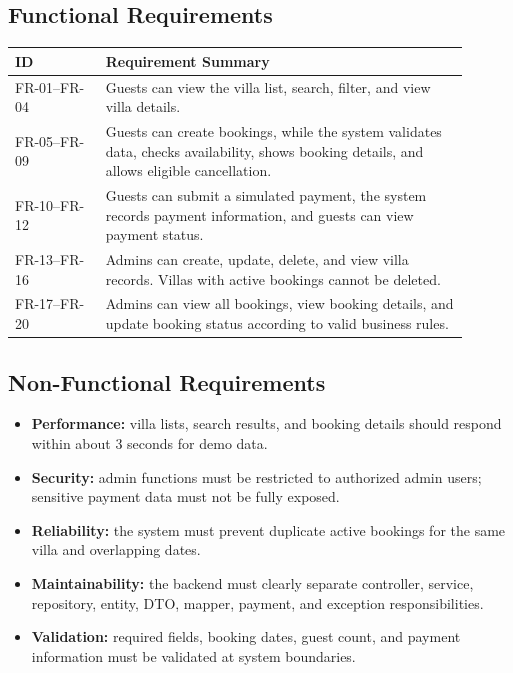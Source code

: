 \documentclass[12pt,a4paper]{article}
\begin{document}
\subsection{Functional Requirements}

\begin{longtable}{|L{0.18\linewidth}|L{0.72\linewidth}|}
\hline
\textbf{ID} & \textbf{Requirement Summary} \\
\hline
FR-01--FR-04 & Guests can view the villa list, search, filter, and view villa details. \\
\hline
FR-05--FR-09 & Guests can create bookings, while the system validates data, checks availability, shows booking details, and allows eligible cancellation. \\
\hline
FR-10--FR-12 & Guests can submit a simulated payment, the system records payment information, and guests can view payment status. \\
\hline
FR-13--FR-16 & Admins can create, update, delete, and view villa records. Villas with active bookings cannot be deleted. \\
\hline
FR-17--FR-20 & Admins can view all bookings, view booking details, and update booking status according to valid business rules. \\
\hline
\end{longtable}

\subsection{Non-Functional Requirements}

\begin{itemize}[noitemsep]
  \item \textbf{Performance:} villa lists, search results, and booking details should respond within about 3 seconds for demo data.
  \item \textbf{Security:} admin functions must be restricted to authorized admin users; sensitive payment data must not be fully exposed.
  \item \textbf{Reliability:} the system must prevent duplicate active bookings for the same villa and overlapping dates.
  \item \textbf{Maintainability:} the backend must clearly separate controller, service, repository, entity, DTO, mapper, payment, and exception responsibilities.
  \item \textbf{Validation:} required fields, booking dates, guest count, and payment information must be validated at system boundaries.
\end{itemize}
\end{document}
